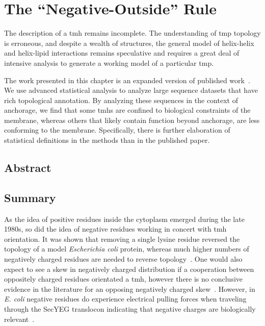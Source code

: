 
\chapter{The ``Negative-Outside'' Rule}

The description of a \gls{tmh} remains incomplete. The understanding of \gls{tmp} topology is erroneous, and despite a wealth of structures, the general model of helix-helix and helix-lipid interactions remains speculative and requires a great deal of intensive analysis to generate a working model of a particular \gls{tmp}.

The work presented in this chapter is an expanded version of published work~\cite{Baker2017}. We use advanced statistical analysis to analyze large sequence datasets that have rich topological annotation. By analyzing these sequences in the context of anchorage, we find that some \gls{tmh}s are confined to biological constraints of the membrane, whereas others that likely contain function beyond anchorage, are less conforming to the membrane. Specifically, there is further elaboration of statistical definitions in the methods than in the published paper.



\section{Abstract}

\section{Summary}
As the idea of positive residues inside the cytoplasm emerged during the late 1980s, so did the idea of negative residues working in concert with \gls{tmh} orientation. It was shown that removing a single lysine residue reversed the topology of a model {\it Escherichia coli} protein, whereas much higher numbers of negatively charged residues are needed to reverse topology~\cite{Nilsson1990}. One would also expect to see a skew in negatively charged distribution if a cooperation between oppositely charged residues orientated a \gls{tmh}, however there is no conclusive evidence in the literature for an opposing negatively charged skew~\cite{Granseth2005, Nilsson2005, Sharpe2010, Baeza-Delgado2013, Pogozheva2013}. However, in {\it E. coli} negative residues do experience electrical pulling forces when traveling through the SecYEG translocon indicating that negative charges are biologically relevant~\cite{Ismail2015}.

